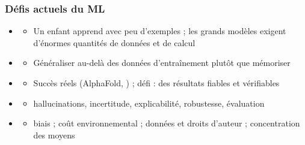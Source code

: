 
\begin{frame}
  \frametitle{Défis actuels du ML}
  \begin{itemize}
  \item {}
    \begin{itemize}
    \item[] Un enfant apprend avec peu d'exemples ; les grands modèles
      exigent d'énormes quantités de données et de calcul
    \end{itemize}
  \item {}
    \begin{itemize}
    \item[] Généraliser au-delà des données d'entraînement plutôt que mémoriser
    \end{itemize}
  \item {}
    \begin{itemize}
    \item[] Succès réels (AlphaFold, ) ; défi : des résultats fiables et vérifiables
    \end{itemize}
  \item {}
    \begin{itemize}
    \item[] hallucinations, incertitude, explicabilité, robustesse, évaluation
    \end{itemize}
  \item {}
    \begin{itemize}
    \item[] biais ; coût environnemental ; données et droits d'auteur ;
      concentration des moyens
    \end{itemize}
  \end{itemize}
\end{frame}

